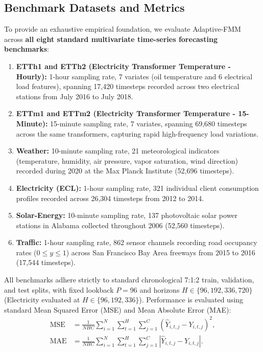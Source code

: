 \documentclass[journal]{IEEEtran}
\begin{document}
\subsection{Benchmark Datasets and Metrics}
To provide an exhaustive empirical foundation, we evaluate Adaptive-FMM across \textbf{all eight standard multivariate time-series forecasting benchmarks}:
\begin{enumerate}
\item \textbf{ETTh1 and ETTh2 (Electricity Transformer Temperature - Hourly):} 1-hour sampling rate, 7 variates (oil temperature and 6 electrical load features), spanning 17,420 timesteps recorded across two electrical stations from July 2016 to July 2018.
\item \textbf{ETTm1 and ETTm2 (Electricity Transformer Temperature - 15-Minute):} 15-minute sampling rate, 7 variates, spanning 69,680 timesteps across the same transformers, capturing rapid high-frequency load variations.
\item \textbf{Weather:} 10-minute sampling rate, 21 meteorological indicators (temperature, humidity, air pressure, vapor saturation, wind direction) recorded during 2020 at the Max Planck Institute (52,696 timesteps).
\item \textbf{Electricity (ECL):} 1-hour sampling rate, 321 individual client consumption profiles recorded across 26,304 timesteps from 2012 to 2014.
\item \textbf{Solar-Energy:} 10-minute sampling rate, 137 photovoltaic solar power stations in Alabama collected throughout 2006 (52,560 timesteps).
\item \textbf{Traffic:} 1-hour sampling rate, 862 sensor channels recording road occupancy rates ($0 \le y \le 1$) across San Francisco Bay Area freeways from 2015 to 2016 (17,544 timesteps).
\end{enumerate}

All benchmarks adhere strictly to standard chronological 7:1:2 train, validation, and test splits, with fixed lookback $P=96$ and horizons $H\in\{96,192,336,720\}$ (Electricity evaluated at $H \in \{96, 192, 336\}$). Performance is evaluated using standard Mean Squared Error (MSE) and Mean Absolute Error (MAE):
\begin{align}
\mathrm{MSE}&=\frac{1}{NHC}\sum_{i=1}^N\sum_{t=1}^H\sum_{j=1}^C(\hat{Y}_{i,t,j}-Y_{i,t,j})^2,\\
\mathrm{MAE}&=\frac{1}{NHC}\sum_{i=1}^N\sum_{t=1}^H\sum_{j=1}^C|\hat{Y}_{i,t,j}-Y_{i,t,j}|.
\end{align}
\end{document}
